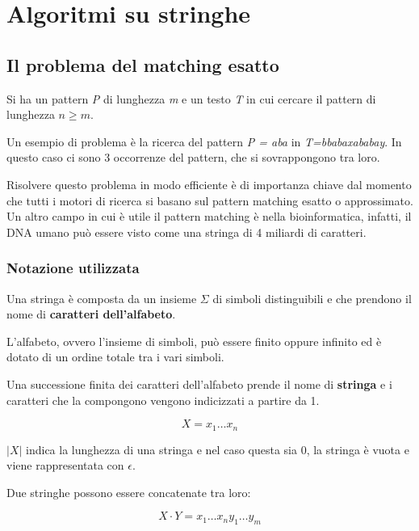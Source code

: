 \chapter{Algoritmi su stringhe}\label{algoritmi-su-stringhe}

\section{Il problema del matching esatto}\label{il-problema-del-matching-esatto}

Si ha un pattern \emph{P} di lunghezza \emph{m} e un testo \emph{T} in
cui cercare il pattern di lunghezza $n \geq m$.

Un esempio di problema è la ricerca del pattern \emph{P = aba} in
\emph{T=bbabaxababay}. In questo caso ci sono 3 occorrenze del pattern,
che si sovrappongono tra loro.

Risolvere questo problema in modo efficiente è di importanza chiave dal
momento che tutti i motori di ricerca si basano sul pattern matching
esatto o approssimato. Un altro campo in cui è utile il pattern matching
è nella bioinformatica, infatti, il DNA umano può essere visto come una
stringa di 4 miliardi di caratteri.

\subsection{Notazione utilizzata}\label{notazione-utilizzata}

Una stringa è composta da un insieme $\Sigma$ di simboli
distinguibili e che prendono il nome di \textbf{caratteri dell'alfabeto}.

L'alfabeto, ovvero l'insieme di simboli, può essere finito oppure
infinito ed è dotato di un ordine totale tra i vari simboli.

Una successione finita dei caratteri dell'alfabeto prende il nome di
\textbf{stringa} e i caratteri che la compongono vengono indicizzati a
partire da 1.

$$
X = x_1 \ldots x_n
$$

$|X|$ indica la lunghezza di una stringa e nel
caso questa sia 0, la stringa è vuota e viene rappresentata con
$\epsilon$.

Due stringhe possono essere concatenate tra loro:

$$
X \cdot Y = x_1\ldots x_ny_1\ldots y_m
$$

